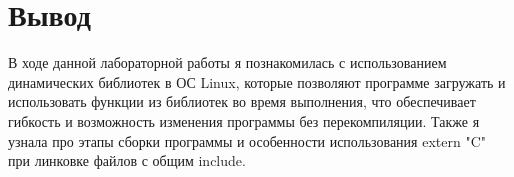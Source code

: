 \documentclass[a4paper, 14pt]{article}
\begin{document}
\section*{Вывод}

В ходе данной лабораторной работы я познакомилась с использованием динамических библиотек в ОС Linux, которые позволяют программе загружать и использовать функции из библиотек во время выполнения, что обеспечивает гибкость и возможность изменения программы без перекомпиляции. Также я узнала про этапы сборки программы и особенности использования extern "C" при линковке файлов с общим include.  
\end{document}
